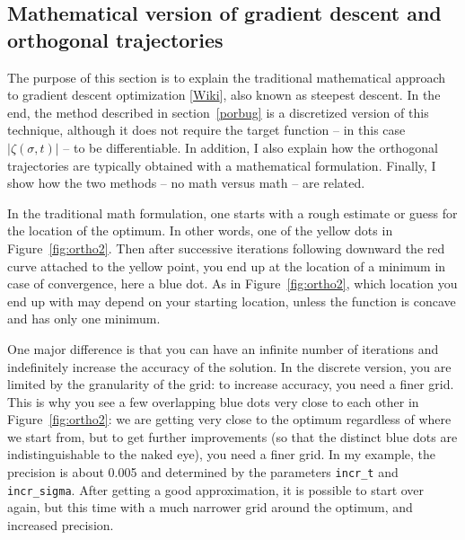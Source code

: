 \documentclass[oneside,10pt]{book}
\begin{document}


\subsection{Mathematical version of gradient descent and orthogonal trajectories}\label{tretra}

The purpose of this section is to explain the traditional mathematical approach to 
 \textcolor{index}{gradient descent} optimization [\href{https://en.wikipedia.org/wiki/Gradient_descent}{Wiki}],
 also known as \textcolor{index}{steepest descent}. In the end, the method described 
 in section~\ref{porbug} is a discretized version of this technique, although it does not require the target function -- in this case $|\zeta(\sigma,t)|$ --
 to be differentiable. In addition, I also explain how the orthogonal trajectories are typically obtained with a mathematical formulation. Finally, I show how the two methods -- no math versus math -- are related.

In the traditional math formulation, one starts with a rough estimate or guess for the location of the optimum. In other words, one of the yellow dots
 in Figure~\ref{fig:ortho2}. Then after successive iterations following downward the red curve attached to the yellow point, you end up at the location of a minimum in case of convergence, here a blue dot. As in Figure~\ref{fig:ortho2}, which location you end up with may depend on your starting location, unless the function is concave and has only one minimum. 

One major difference is that you can have an infinite number
 of iterations and indefinitely increase the accuracy of the solution. In the discrete version, you are limited by the granularity of the grid: to increase accuracy, you need a finer grid. This is why you see a few overlapping blue dots very close to each other in Figure~\ref{fig:ortho2}: we are getting very close to the optimum regardless of where we start from, but to get further improvements (so that the distinct blue dots are indistinguishable to the naked eye), you need a finer grid.  In my example, the precision is about 0.005 and determined by the parameters  
\texttt{incr\_t} and \texttt{incr\_sigma}. After getting a good approximation, it is possible to start over again, but this time with a much narrower grid around the optimum, and increased precision.
\end{document}
